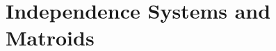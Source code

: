 \documentclass[main]{subfiles}
\begin{document}

\section{Independence Systems and Matroids}
\end{document}
